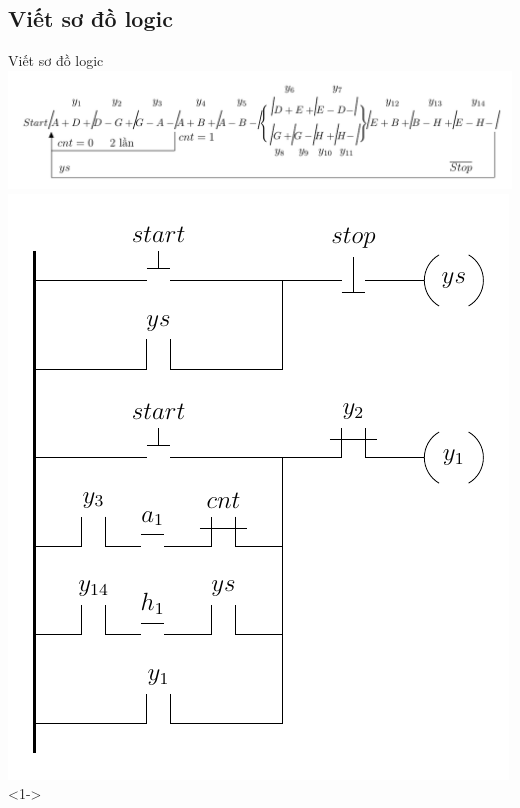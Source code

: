 \documentclass[24pt]{beamer}
\begin{document}
\subsection*{Viết sơ đồ logic}
\begin{frame}[plain]{Viết sơ đồ logic}
	\vspace{-.5cm}
	\hspace{-1cm}\includegraphics[scale=0.7]{draw-tikz/quatrinh-bt4-buoc1-gomnhom.pdf}\\
	\vspace{-.5cm}
	\includegraphics[scale=0.6]{draw-tikz/quatrinh-bt4-buoc2-sodologic-b1.pdf}<1->

\end{frame}
\end{document}
